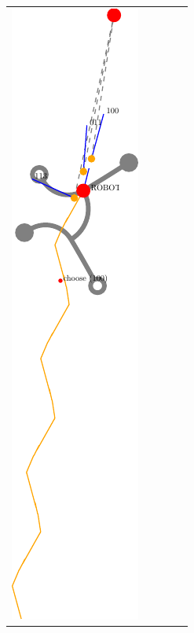 \documentclass[10pt,a4paper]{article}
\begin{document}
\begin{tabular}{ccccc}
\includegraphics[scale=.8]{pics/pathplanner_without_noise/example_straight/dec_68.pdf}
&

\end{tabular}
\end{document}
